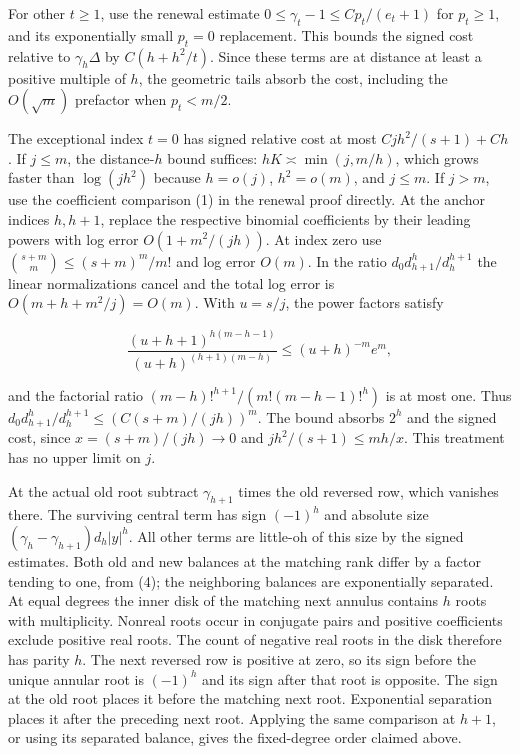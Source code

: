 \documentclass[11pt]{article}
\begin{document}
For other \(t\ge1\), use the renewal estimate \(0\le\gamma_t-1\le C p_t/(e_t+1)\) for \(p_t\ge1\), and its exponentially small \(p_t=0\) replacement. This bounds the signed cost relative to \(\gamma_h\Delta\) by \(C(h+h^2/t)\). Since these terms are at distance at least a positive multiple of \(h\), the geometric tails absorb the cost, including the \(O(\sqrt m)\) prefactor when \(p_t<m/2\).

The exceptional index \(t=0\) has signed relative cost at most \(Cjh^2/(s+1)+Ch\). If \(j\le m\), the distance-\(h\) bound suffices: \(hK\asymp \min(j,m/h)\), which grows faster than \(\log(jh^2)\) because \(h=o(j)\), \(h^2=o(m)\), and \(j\le m\). If \(j>m\), use the coefficient comparison (1) in the renewal proof directly. At the anchor indices \(h,h+1\), replace the respective binomial coefficients by their leading powers with log error \(O(1+m^2/(jh))\). At index zero use \(\binom{s+m}{m}\le (s+m)^m/m!\) and log error \(O(m)\). In the ratio \(d_0d_{h+1}^h/d_h^{h+1}\) the linear normalizations cancel and the total log error is \(O(m+h+m^2/j)=O(m)\). With \(u=s/j\), the power factors satisfy

\begin{equation*}
\frac{(u+h+1)^{h(m-h-1)}}{(u+h)^{(h+1)(m-h)}}\le
 (u+h)^{-m}e^m,
\end{equation*}

and the factorial ratio \((m-h)!^{h+1}/(m!(m-h-1)!^h)\) is at most one. Thus \(d_0d_{h+1}^h/d_h^{h+1}\le(C(s+m)/(jh))^m\). The bound absorbs \(2^h\) and the signed cost, since \(x=(s+m)/(jh)\to0\) and \(jh^2/(s+1)\le mh/x\). This treatment has no upper limit on \(j\).

At the actual old root subtract \(\gamma_{h+1}\) times the old reversed row, which vanishes there. The surviving central term has sign \((-1)^h\) and absolute size \((\gamma_h-\gamma_{h+1})d_h |y|^h\). All other terms are little-oh of this size by the signed estimates. Both old and new balances at the matching rank differ by a factor tending to one, from (4); the neighboring balances are exponentially separated. At equal degrees the inner disk of the matching next annulus contains \(h\) roots with multiplicity. Nonreal roots occur in conjugate pairs and positive coefficients exclude positive real roots. The count of negative real roots in the disk therefore has parity \(h\). The next reversed row is positive at zero, so its sign before the unique annular root is \((-1)^h\) and its sign after that root is opposite. The sign at the old root places it before the matching next root. Exponential separation places it after the preceding next root. Applying the same comparison at \(h+1\), or using its separated balance, gives the fixed-degree order claimed above.
\end{document}

